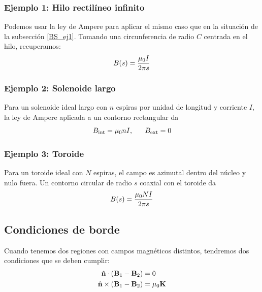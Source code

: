 \documentclass[]{article}
\numberwithin{equation}{section}
\begin{document}
\subsubsection{Ejemplo 1: Hilo rectilíneo infinito}
Podemos usar la ley de Ampere para aplicar el mismo caso que en la situación de la subsección \ref{BS_ej1}. Tomando una circunferencia de radio \(C\) centrada en el hilo, recuperamos:
\begin{equation*}
	B(s) = \frac{\mu_{0} I}{2 \pi s}
\end{equation*}

\subsubsection{Ejemplo 2: Solenoide largo}
Para un solenoide ideal largo con \(n\) espiras por unidad de longitud y corriente \(I\), la ley de Ampere aplicada a un contorno rectangular da
\begin{equation}
	B_{\mathrm{int}} = \mu_{0} n I, ~~~~~ B_{\mathrm{ext}} = 0
\end{equation}

\subsubsection{Ejemplo 3: Toroide}
Para un toroide ideal con \(N\) espiras, el campo es azimutal dentro del núcleo y nulo fuera. Un contorno circular de radio \(s\) coaxial con el toroide da
\begin{equation}
	B(s) = \frac{\mu_{0} N I}{2 \pi s}
\end{equation}

\subsection{Condiciones de borde}
Cuando tenemos dos regiones con campos magnéticos distintos, tendremos dos condiciones que se deben cumplir:
\begin{align}
	\hat{\mathbf{n}} \cdot  (\mathbf{B}_{1} - \mathbf{B}_{2}) &= 0\\
	\hat{\mathbf{n}} \times (\mathbf{B}_{1} - \mathbf{B}_{2}) &= \mu_{0} \mathbf{K}
\end{align}
\end{document}

